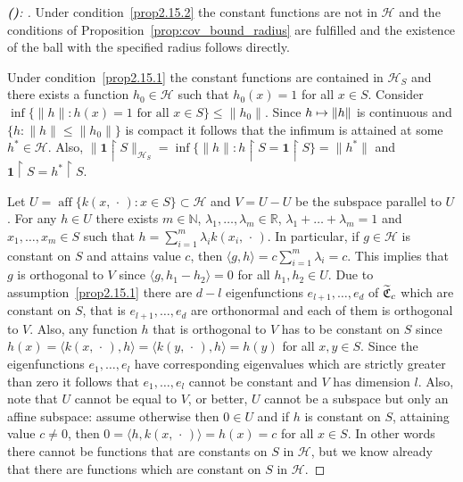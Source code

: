 \documentclass[AHL,Unicode,longabstracts,published]{cedram}
\theoremstyle{remark}
\DeclareMathOperator{\aff}{aff}
\newcommand{\restrr}
{\!\!\upharpoonright\!\!}
\newcommand{\R}{\mathbb{R}}
\newcommand{\bbN}{\mathbb{N}}
\newcommand{\cH}{\mathcal{H}}
\newcommand{\fkC}{\mathfrak{C}}
\let\oldtilde\tilde
\renewcommand*{\tilde}[1]{\mathchoice{\widetilde{#1}}{\widetilde{#1}}{\oldtilde{#1}}{\oldtilde{#1}}}
\let\oldmapsto\mapsto
\renewcommand*{\mapsto}{\mathchoice{\longmapsto}{\oldmapsto}{\oldmapsto}{\oldmapsto}}
\newcounter{setofstep}
\newcounter{step}[setofstep]
\newenvironment{step}[1][]{\refstepcounter{step}\begin{proof}[{\textbf{(\thestep)}\if#1\empty\else: #1\fi}]}{\let\qed\relax\end{proof}}
\renewcommand{\thestep}{\alph{step}}
\begin{document}
\begin{proofc}
\begin{step}\label{prfprop2.15stp5}
Under condition~\eqref{prop2.15.2} the constant functions are not in $\cH$ and the conditions of Proposition~\ref{prop:cov_bound_radius} are fulfilled and the existence of the ball with the specified radius follows directly.



Under condition~\eqref{prop2.15.1} the constant functions are contained in $\cH_S$ and there exists a function $h_0 \in \cH$ such that $h_0(x)= 1$ for all $x \in S$. Consider $\inf \{\|h \| : h(x) =1 \text{ for all } x \in S \} \leq \|h_0\|$. Since $h \mapsto \|h\|$ is continuous and $\{ h : \|h \| \leq \|h_0\|\}$ is compact it follows that the infimum is attained at some $h^* \in \cH$. Also, $\|\bm 1\restrr S\|_{\cH_S} = \inf \{\|h\| : h\restrr S = \bm 1\restrr S \} = \|h^*\|$ and $\bm 1\restrr S = h^*\restrr S$.

Let $U= \aff \{ k(x,\,\cdot\,) : x\in S\} \subset \cH$ and $V = U-U$ be the subspace parallel to $U$. For any $h \in U$ there exists $m \in \bbN$, $\lambda_1,\dots, \lambda_m \in \R$, $\lambda_1 + \dots + \lambda_m = 1$ and $x_1,\dots, x_m \in S$ such that $h = \sum_{i=1}^m \lambda_i k(x_i,\,\cdot\,)$. In particular, if $g \in \cH$ is constant on $S$ and attains value $c$, then $\langle g,h \rangle = c \sum_{i=1}^m \lambda_i = c$. This implies that $g$ is orthogonal to $V$ since $\langle g, h_1 - h_2 \rangle = 0 $ for all $h_1,h_2 \in U$. Due to assumption~\eqref{prop2.15.1} there are $d-l$ eigenfunctions $e_{l+1},\dots, e_d$ of $\tilde{\fkC}_c$ which are constant on $S$, that is $e_{l+1},\dots, e_d$ are orthonormal and each of them is orthogonal to $V$. Also, any function $h$ that is orthogonal to $V$ has to be constant on $S$ since $h(x) = \langle k(x,\,\cdot\,), h \rangle = \langle k(y,\,\cdot\,), h \rangle =h(y)$ for all $x,y \in S$. Since the eigenfunctions $e_1, \dots, e_l$ have corresponding eigenvalues which are strictly greater than zero it follows that $e_1,\dots, e_l$ cannot be constant and $V$ has dimension $l$. Also, note that $U$ cannot be equal to $V$, or better, $U$ cannot be a subspace but only an affine subspace: assume otherwise then $0 \in U$ and if $h$ is constant on $S$, attaining value $c \not = 0$, then $0 = \langle h, k(x,\,\cdot\,) \rangle = h(x) = c $ for all $x \in S$. In other words there cannot be functions that are constants on $S$ in $\cH$, but we know already that there are functions which are constant on $S$ in $\cH$.
\end{step}


\end{proofc}
\end{document}
